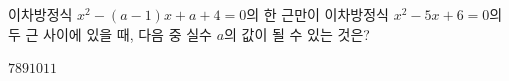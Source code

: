 이차방정식 $x^2-(a-1)x+a+4=0$의 한 근만이 이차방정식 $x^2-5x+6=0$의 두 근 사이에 있을 때, 다음 중 실수 $a$의 값이 될 수 있는 것은?
\begin{choices32}{$7$}{$8$}{$9$}{$10$}{$11$}\end{choices32}
